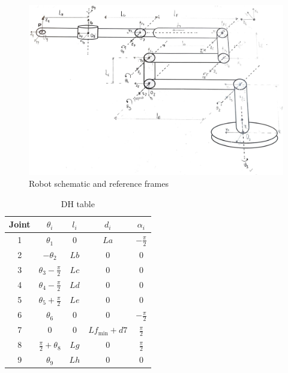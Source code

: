 \documentclass{report}
\begin{document}
\begin{figure}[h]
    \centering
    \includegraphics[scale=0.2]{resources/robot_draw.jpeg}
    \caption{\label{fig:r_draw}Robot schematic and reference frames}
\end{figure}

\begin{table}[H]
    \centering
    \begin{tabular}{|c|c|c|c|c|}
        \hline
        Joint & $\theta_i$                 & $l_i$ & $d_i$                  & $\alpha_i$       \\
        \hline
        1     & $\theta_1$                 & 0     & $La$                   & $-\frac{\pi}{2}$ \\
        \hline
        2     & $-\theta_2$                & $Lb$  & 0                      & 0                \\
        \hline
        3     & $\theta_3 - \frac{\pi}{2}$ & $Lc$  & 0                      & 0                \\
        \hline
        4     & $\theta_4 - \frac{\pi}{2}$ & $Ld$  & 0                      & 0                \\
        \hline
        5     & $\theta_5 + \frac{\pi}{2}$ & $Le$  & 0                      & 0                \\
        \hline
        6     & $\theta_6$                 & 0     & 0                      & $-\frac{\pi}{2}$ \\
        \hline
        7     & 0                          & 0     & $Lf_{\text{min}} + d7$ & $\frac{\pi}{2}$  \\
        \hline
        8     & $\frac{\pi}{2} + \theta_8$ & $Lg$  & 0                      & $\frac{\pi}{2}$  \\
        \hline
        9     & $\theta_9$                 & $Lh$  & 0                      & 0                \\
        \hline
    \end{tabular}
    \caption{DH table}
    \label{tab:dh}
\end{table}
\end{document}
